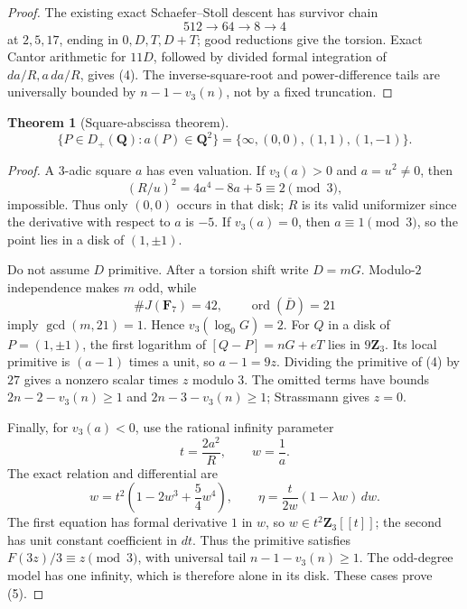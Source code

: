 \documentclass[11pt]{article}
\newtheorem{theorem}{Theorem}
\newcommand{\Q}{\mathbf Q}
\begin{document}
\begin{proof}
The existing exact Schaefer--Stoll descent has survivor chain
\[
 512\longrightarrow64\longrightarrow8\longrightarrow4
\]
at \(2,5,17\), ending in \(0,D,T,D+T\); good reductions give the torsion.
Exact Cantor arithmetic for \(11D\), followed by divided formal integration
of \(da/R,a\,da/R\), gives (4).  The inverse-square-root and
power-difference tails are universally bounded by
\(n-1-v_3(n)\), not by a fixed truncation.
\end{proof}

\begin{theorem}[Square-abscissa theorem]\label{thm:square}
\[
\{P\in D_+(\Q):a(P)\in\Q^2\}
=\{\infty,(0,0),(1,1),(1,-1)\}.                    \tag{5}
\]
\end{theorem}

\begin{proof}
A \(3\)-adic square \(a\) has even valuation.  If \(v_3(a)>0\) and
\(a=u^2\ne0\), then
\[
 (R/u)^2=4a^4-8a+5\equiv2\pmod3,
\]
impossible.  Thus only \((0,0)\) occurs in that disk; \(R\) is its valid
uniformizer since the derivative with respect to \(a\) is \(-5\).
If \(v_3(a)=0\), then \(a\equiv1\pmod3\), so the point lies in a disk of
\((1,\pm1)\).

Do not assume \(D\) primitive.  After a torsion shift write \(D=mG\).
Modulo-\(2\) independence makes \(m\) odd, while
\[
 \#J(\mathbf F_7)=42,\qquad\operatorname{ord}(\bar D)=21
\]
imply \(\gcd(m,21)=1\).  Hence \(v_3(\log_0G)=2\).
For \(Q\) in a disk of \(P=(1,\pm1)\), the first logarithm of
\([Q-P]=nG+eT\) lies in \(9\mathbf Z_3\).  Its local primitive is
\((a-1)\) times a unit, so \(a-1=9z\).  Dividing the primitive of (4) by
\(27\) gives a nonzero scalar times \(z\) modulo \(3\).  The omitted terms
have bounds \(2n-2-v_3(n)\ge1\) and \(2n-3-v_3(n)\ge1\);
Strassmann gives \(z=0\).

Finally, for \(v_3(a)<0\), use the rational infinity parameter
\[
 t=\frac{2a^2}{R},\qquad w=\frac1a.
\]
The exact relation and differential are
\[
 w=t^2\left(1-2w^3+\frac54w^4\right),\qquad
 \eta=\frac{t}{2w}(1-\lambda w)\,dw.                \tag{6}
\]
The first equation has formal derivative \(1\) in \(w\), so
\(w\in t^2\mathbf Z_3[[t]]\); the second has unit constant coefficient in
\(dt\).  Thus the primitive satisfies \(F(3z)/3\equiv z\pmod3\), with
universal tail \(n-1-v_3(n)\ge1\).  The odd-degree model has one infinity,
which is therefore alone in its disk.  These cases prove (5).
\end{proof}
\end{document}
